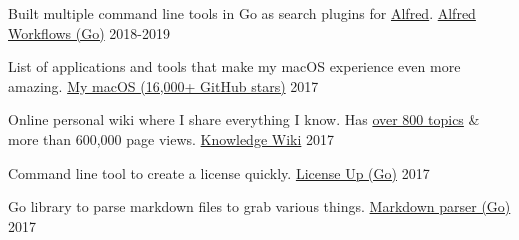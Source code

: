 
\begin{cventries}

  \cventry
    {Built multiple command line tools in Go as search plugins for \href{https://www.alfredapp.com}{Alfred}.}
    {\href{https://wiki.nikitavoloboev.xyz/sharing/my-github}{Alfred Workflows (Go)}}
    {}
    {2018-2019}
    {
    }

    \cventry
    {List of applications and tools that make my macOS experience even more amazing.}
    {\href{https://github.com/nikitavoloboev/my-mac-os}{My macOS (16,000+ GitHub stars)}}
    {}
    {2017}
    {
    }

    \cventry
    {Online personal wiki where I share everything I know. Has \href{https://github.com/nikitavoloboev/knowledge/blob/master/SUMMARY.md}{over 800 topics} \& more than 600,000 page views.}
    {\href{https://wiki.nikitavoloboev.xyz}{Knowledge Wiki}}
    {}
    {2017}
    {
    }

    \cventry
    {Command line tool to create a license quickly.}
    {\href{https://github.com/nikitavoloboev/license-up}{License Up (Go)}}
    {}
    {2017}
    {
    }

    \cventry
    {Go library to parse markdown files to grab various things.}
    {\href{https://github.com/nikitavoloboev/markdown-parser}{Markdown parser (Go)}}
    {}
    {2017}
    {
    }

\end{cventries}
